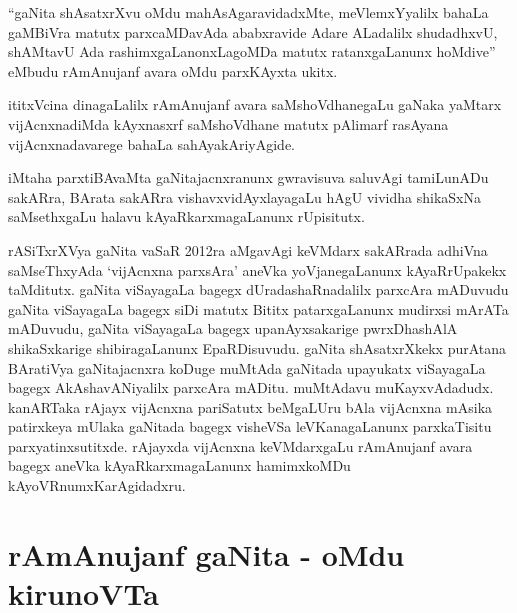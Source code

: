 ``gaNita shAsatxrXvu oMdu mahAsAgaravidadxMte, meVlemxYyalilx bahaLa gaMBiVra matutx parxcaMDavAda ababxravide Adare ALadalilx  shudadhxvU, shAMtavU Ada rashimxgaLanonxLagoMDa matutx ratanxgaLanunx hoMdive'' eMbudu rAmAnujanf avara oMdu parxKAyxta ukitx.

ititxVcina dinagaLalilx rAmAnujanf avara saMshoVdhanegaLu gaNaka yaMtarx vijAcnxnadiMda kAyxnasxrf saMshoVdhane matutx pAlimarf rasAyana vijAcnxnadavarege bahaLa sahAyakAriyAgide.

iMtaha parxtiBAvaMta gaNitajacnxranunx gwravisuva saluvAgi tamiLunADu sakARra, BArata sakARra vishavxvidAyxlayagaLu hAgU vividha shikaSxNa saMsethxgaLu halavu kAyaRkarxmagaLanunx rUpisitutx.

rASiTxrXVya gaNita vaSaR {\rm 2012}ra aMgavAgi keVMdarx sakARrada adhiVna saMseThxyAda `vijAcnxna parxsAra' aneVka yoVjanegaLanunx kAyaRrUpakekx taMditutx. gaNita viSayagaLa bagegx dUradashaRnadalilx parxcAra mADuvudu gaNita viSayagaLa bagegx siDi matutx Bititx patarxgaLanunx mudirxsi mArATa mADuvudu, gaNita viSayagaLa bagegx upanAyxsakarige pwrxDhashAlA shikaSxkarige shibiragaLanunx EpaRDisuvudu. gaNita shAsatxrXkekx purAtana BAratiVya gaNitajacnxra koDuge muMtAda gaNitada upayukatx viSayagaLa bagegx AkAshavANiyalilx parxcAra mADitu. muMtAdavu muKayxvAdadudx. kanARTaka rAjayx vijAcnxna pariSatutx beMgaLUru bAla vijAcnxna mAsika patirxkeya mUlaka gaNitada bagegx visheVSa leVKanagaLanunx parxkaTisitu parxyatinxsutitxde. rAjayxda vijAcnxna keVMdarxgaLu rAmAnujanf avara bagegx aneVka kAyaRkarxmagaLanunx hamimxkoMDu kAyoVRnumxKarAgidadxru.

\section*{rAmAnujanf gaNita - oMdu kirunoVTa}

